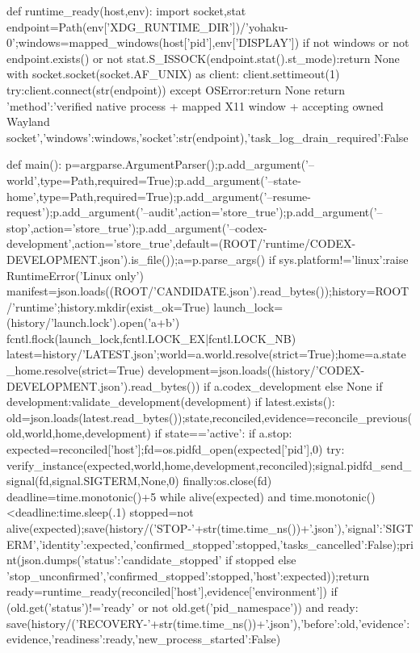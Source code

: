 def runtime_ready(host,env):
 import socket,stat
 endpoint=Path(env['XDG_RUNTIME_DIR'])/'yohaku-0';windows=mapped_windows(host['pid'],env['DISPLAY'])
 if not windows or not endpoint.exists() or not stat.S_ISSOCK(endpoint.stat().st_mode):return None
 with socket.socket(socket.AF_UNIX) as client:
  client.settimeout(1)
  try:client.connect(str(endpoint))
  except OSError:return None
 return {'method':'verified native process + mapped X11 window + accepting owned Wayland socket','windows':windows,'socket':str(endpoint),'task_log_drain_required':False}

def main():
 p=argparse.ArgumentParser();p.add_argument('--world',type=Path,required=True);p.add_argument('--state-home',type=Path,required=True);p.add_argument('--resume-request');p.add_argument('--audit',action='store_true');p.add_argument('--stop',action='store_true');p.add_argument('--codex-development',action='store_true',default=(ROOT/'runtime/CODEX-DEVELOPMENT.json').is_file());a=p.parse_args()
 if sys.platform!='linux':raise RuntimeError('Linux only')
 manifest=json.loads((ROOT/'CANDIDATE.json').read_bytes());history=ROOT/'runtime';history.mkdir(exist_ok=True)
 launch_lock=(history/'launch.lock').open('a+b')
 fcntl.flock(launch_lock,fcntl.LOCK_EX|fcntl.LOCK_NB)
 latest=history/'LATEST.json';world=a.world.resolve(strict=True);home=a.state_home.resolve(strict=True)
 development=json.loads((history/'CODEX-DEVELOPMENT.json').read_bytes()) if a.codex_development else None
 if development:validate_development(development)
 if latest.exists():
  old=json.loads(latest.read_bytes());state,reconciled,evidence=reconcile_previous(old,world,home,development)
  if state=='active':
   if a.stop:
    expected=reconciled['host'];fd=os.pidfd_open(expected['pid'],0)
    try:
     verify_instance(expected,world,home,development,reconciled);signal.pidfd_send_signal(fd,signal.SIGTERM,None,0)
    finally:os.close(fd)
    deadline=time.monotonic()+5
    while alive(expected) and time.monotonic()<deadline:time.sleep(.1)
    stopped=not alive(expected);save(history/('STOP-'+str(time.time_ns())+'.json'),{'signal':'SIGTERM','identity':expected,'confirmed_stopped':stopped,'tasks_cancelled':False});print(json.dumps({'status':'candidate_stopped' if stopped else 'stop_unconfirmed','confirmed_stopped':stopped,'host':expected}));return
   ready=runtime_ready(reconciled['host'],evidence['environment'])
   if (old.get('status')!='ready' or not old.get('pid_namespace')) and ready:
    save(history/('RECOVERY-'+str(time.time_ns())+'.json'),{'before':old,'evidence':evidence,'readiness':ready,'new_process_started':False})
